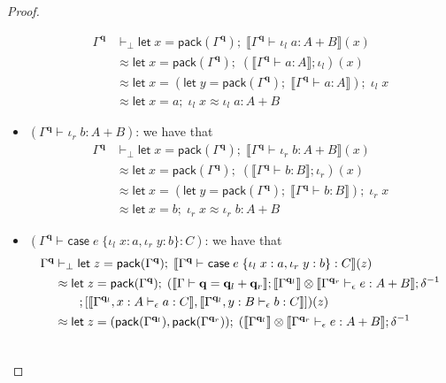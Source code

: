 \documentclass[acmsmall,screen,review]{acmart}
\newcommand{\mb}[1]{\ensuremath{\mathbf{#1}}}
\newcommand{\ms}[1]{\ensuremath{\mathsf{#1}}}
\newcommand{\lto}{:}
\newcommand{\linl}[1]{\iota_l\;{#1}}
\newcommand{\linr}[1]{\iota_r\;{#1}}
\newcommand{\letexpr}[3]{\ensuremath{\ms{let}\;#1 = #2;\;#3}}
\newcommand{\caseexpr}[5]{\ms{case}\;#1\;\{\linl{#2} \lto #3, \linr{#4} \lto #5\}}
\newcommand{\qsp}[4]{#1 \vdash #2 = #3 + #4}
\newcommand{\hasty}[4]{#1 \vdash_{#2} #3: {#4}}
\newcommand{\dnt}[1]{\llbracket{#1}\rrbracket}
\begin{document}
\begin{proof}
\begin{itemize}
    \begin{align*}
    \Gamma^{\mb{q}} &\vdash_\bot
      \letexpr{x}{\ms{pack}(\Gamma^{\mb{q}})}{\dnt{\hasty{\Gamma^{\mb{q}}}{}{\linl{a}}{A + B}}(x)}
      \\ &\approx 
      \letexpr{x}{\ms{pack}(\Gamma^{\mb{q}})}
        {(\dnt{\hasty{\Gamma^{\mb{q}}}{}{a}{A}} ; \iota_l)(x)}
      \\ &\approx
      \letexpr{x}{(\letexpr{y}{\ms{pack}(\Gamma^{\mb{q}})}{\dnt{\hasty{\Gamma^{\mb{q}}}{}{a}{A}}})}
        {\linl{x}} 
      \\ &\approx
      \letexpr{x}{a}{\linl{x}} \approx \linl{a} : A + B
    \end{align*}
    \item $(\hasty{\Gamma^{\mb{q}}}{}{\linr{b}}{A + B})$: we have that
    \begin{align*}
    \Gamma^{\mb{q}} &\vdash_\bot
      \letexpr{x}{\ms{pack}(\Gamma^{\mb{q}})}{\dnt{\hasty{\Gamma^{\mb{q}}}{}{\linr{b}}{A + B}}(x)}
      \\ &\approx 
      \letexpr{x}{\ms{pack}(\Gamma^{\mb{q}})}
        {(\dnt{\hasty{\Gamma^{\mb{q}}}{}{b}{B}} ; \iota_r)(x)}
      \\ &\approx
      \letexpr{x}{(\letexpr{y}{\ms{pack}(\Gamma^{\mb{q}})}{\dnt{\hasty{\Gamma^{\mb{q}}}{}{b}{B}}})}
        {\linr{x}} 
      \\ &\approx
      \letexpr{x}{b}{\linr{x}} \approx \linr{b} : A + B
    \end{align*}
    \item $(\hasty{\Gamma^{\mb{q}}}{}{\caseexpr{e}{x}{a}{y}{b}}{C})$: we have that
    \begin{align*}
    \Gamma^{\mb{q}} &\vdash_\bot
      \letexpr{z}{\ms{pack}(\Gamma^{\mb{q}})}
        {\dnt{\hasty{\Gamma^{\mb{q}}}{}{\caseexpr{e}{x}{a}{y}{b}}{C}}(z)}
      \\ &\approx 
      \letexpr{z}{\ms{pack}(\Gamma^{\mb{q}})}{(\dnt{\qsp{\Gamma}{\mb{q}}{\mb{q}_l}{\mb{q}_r}}
        ; \dnt{\Gamma^{\mb{q}_l}} \otimes \dnt{\hasty{\Gamma^{\mb{q}_r}}{\epsilon}{e}{A + B}}
        ; \delta^{-1} \\ & \qquad
        ; [
          \dnt{\hasty{\Gamma^{\mb{q}_l}, x : A}{\epsilon}{a}{C}},
          \dnt{\hasty{\Gamma^{\mb{q}_l}, y : B}{\epsilon}{b}{C}}
        ])(z)}
      \\ &\approx
      \letexpr{z}{(\ms{pack}(\Gamma^{\mb{q}_l}), \ms{pack}(\Gamma^{\mb{q}_r}))}{(
        \dnt{\Gamma^{\mb{q}_l}} \otimes \dnt{\hasty{\Gamma^{\mb{q}_r}}{\epsilon}{e}{A + B}}
        ; \delta^{-1} \\ & \qquad
}
\end{align*}
\end{itemize}
\end{proof}
\end{document}
